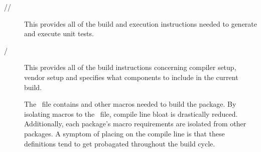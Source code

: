 \begin{description}
%
\item[//] This
   provides all of the build and execution instructions needed to generate and execute unit tests. 
\item[/] This
   provides all of the build instructions concerning compiler setup, vendor setup and specifies what components to include in the current build.
\item[] The \confhin\ file 
  contains  and other  macros needed to build 
  the package.  By isolating macros to the \confhin\ file, compile
  line bloat is drastically reduced.  Additionally, each package's
  macro requirements are isolated from other packages.  A symptom of
  placing  on the compile line is that these
  definitions tend to get probagated throughout the build cycle.
\end{description}


